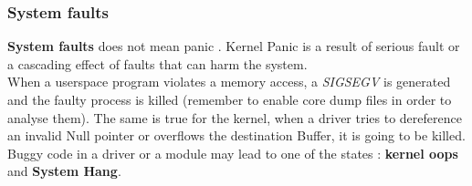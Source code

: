 \subsubsection{System faults}
\textbf{System faults} does not mean \og panic \fg. Kernel Panic is a result of serious fault or a cascading effect of faults that can harm the system.\\
When a userspace program violates a memory access, a \emph{SIGSEGV} is generated and the faulty process is killed (remember to enable core dump files in order to analyse them). The same is true for the kernel, when a driver tries to dereference an invalid Null pointer or overflows the destination Buffer, it is going to be killed.\\


Buggy code in a driver or a module may lead to one of the states : \textbf{kernel oops} and \textbf{System Hang}.\\
\vspace{8px}


